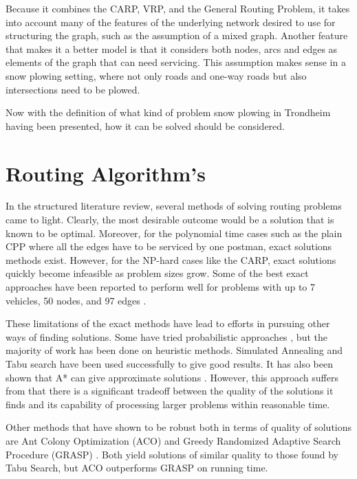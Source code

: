 Because it combines the CARP, VRP, and the General Routing Problem, it takes into account many of the features of the underlying network desired to use for structuring the graph, such as the assumption of a mixed graph. Another feature that makes it a better model is that it considers both nodes, arcs and edges as elements of the graph that can need servicing. This assumption makes sense in a snow plowing setting, where not only roads and one-way roads but also intersections need to be plowed.

Now with the definition of what kind of problem snow plowing in Trondheim having been presented, how it can be solved should be considered.


\section{Routing Algorithm's} %
\label{sec:routing_algorithms}

In the structured literature review, several methods of solving routing problems came to light. Clearly, the most desirable outcome would be a solution that is known to be optimal. Moreover, for the polynomial time cases such as the plain CPP where all the edges have to be serviced by one postman, exact solutions methods exist. However, for the NP-hard cases like the CARP, exact solutions quickly become infeasible as problem sizes grow. Some of the best exact approaches have been reported to perform well for problems with up to 7 vehicles, 50 nodes, and 97 edges \citep{belenguer2003cutting}.

These limitations of the exact methods have lead to efforts in pursuing other ways of finding solutions. Some have tried probabilistic approaches \citep{christiansen2009branch}, but the majority of work has been done on heuristic methods. Simulated Annealing \citep{eglese1994simulatedAnnealing} and Tabu search \citep{brandao2008tabu} have been used successfully to give good results. It has also been shown that A* can give approximate solutions \citep{rao2011AStar}. However, this approach suffers from that there is a significant tradeoff between the quality of the solutions it finds and its capability of processing larger problems within reasonable time.

Other methods that have shown to be robust both in terms of quality of solutions are Ant Colony Optimization (ACO) \citep{santos2010ACO} and Greedy Randomized Adaptive Search Procedure (GRASP) \citep{usberti2013grasp}. Both yield solutions of similar quality to those found by Tabu Search, but ACO outperforms GRASP on running time.

